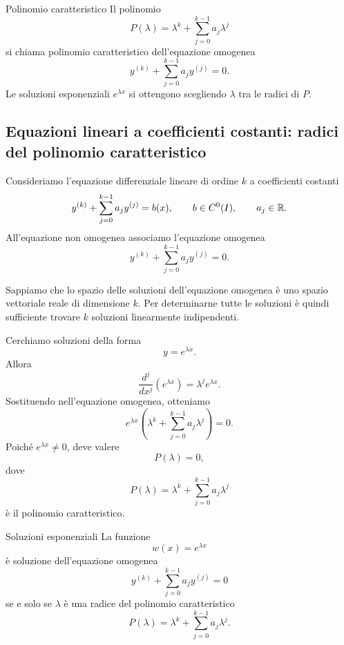 \documentclass[a4paper]{article}
\begin{document}
\begin{radioactive}
\begin{snippetdefinition}{Polinomio caratteristico}
    Il polinomio
    \[
        P(\lambda)
        =
        \lambda^k+\sum_{j=0}^{k-1}a_j\lambda^j
    \]
    si chiama polinomio caratteristico dell'equazione omogenea
    \[
        y^{(k)}+\sum_{j=0}^{k-1}a_jy^{(j)}=0.
    \]
    Le soluzioni esponenziali \(e^{\lambda x}\) si ottengono scegliendo \(\lambda\) tra le radici di \(P\).
\end{snippetdefinition}
\end{radioactive}

\subsection{Equazioni lineari a coefficienti costanti: radici del polinomio caratteristico}

\begin{radioactive}
Consideriamo l'equazione differenziale lineare di ordine \(k\) a coefficienti costanti
\[
    y^{(k)}+\sum_{j=0}^{k-1}a_jy^{(j)}=b(x),
    \qquad b\in C^0(I),
    \qquad a_j\in\mathbb{R}.
\]
All'equazione non omogenea associamo l'equazione omogenea
\[
    y^{(k)}+\sum_{j=0}^{k-1}a_jy^{(j)}=0.
\]

Sappiamo che lo spazio delle soluzioni dell'equazione omogenea è uno spazio vettoriale reale di dimensione \(k\). Per determinarne tutte le soluzioni è quindi sufficiente trovare \(k\) soluzioni linearmente indipendenti.

Cerchiamo soluzioni della forma
\[
    y=e^{\lambda x}.
\]
Allora
\[
    \frac{d^j}{dx^j}\left(e^{\lambda x}\right)=\lambda^je^{\lambda x}.
\]
Sostituendo nell'equazione omogenea, otteniamo
\[
    e^{\lambda x}
    \left(
        \lambda^k+\sum_{j=0}^{k-1}a_j\lambda^j
    \right)=0.
\]
Poiché \(e^{\lambda x}\neq 0\), deve valere
\[
    P(\lambda)=0,
\]
dove
\[
    P(\lambda)=\lambda^k+\sum_{j=0}^{k-1}a_j\lambda^j
\]
è il polinomio caratteristico.
\end{radioactive}

\begin{radioactive}
\begin{snippettheorem}{Soluzioni esponenziali}
    La funzione
    \[
        w(x)=e^{\lambda x}
    \]
    è soluzione dell'equazione omogenea
    \[
        y^{(k)}+\sum_{j=0}^{k-1}a_jy^{(j)}=0
    \]
    se e solo se \(\lambda\) è una radice del polinomio caratteristico
    \[
        P(\lambda)=\lambda^k+\sum_{j=0}^{k-1}a_j\lambda^j.
    \]
\end{snippettheorem}
\end{radioactive}
\end{document}
